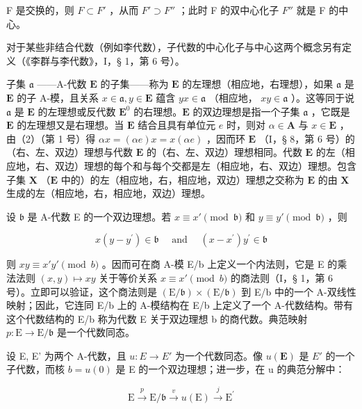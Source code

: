 F 是交换的，则 \(F \subset F'\) ，从而 \(F' \supset F''\) ；此时 F 的双中心化子 \(F''\) 就是 F 的中心。

对于某些非结合代数（例如李代数），子代数的中心化子与中心这两个概念另有定义（《李群与李代数》，I，§ 1，第 6 号）。

子集 \(\mathfrak{a}\) ——A-代数 \(\mathbf{E}\) 的子集——称为 \(\mathbf{E}\) 的左理想（相应地，右理想），如果 \(\mathfrak{a}\) 是 \(\mathbf{E}\) 的子 A-模，且关系 \(x \in \mathfrak{a}, y \in \mathbf{E}\) 蕴含 \(yx \in \mathfrak{a}\) （相应地， \(xy \in \mathfrak{a}\) ）。这等同于说 \(\mathfrak{a}\) 是 \(\mathbf{E}\) 的左理想或反代数 \(\mathbf{E}^0\) 的右理想。\(\mathbf{E}\) 的双边理想是指一个子集 \(\mathfrak{a}\) ，它既是 \(\mathbf{E}\) 的左理想又是右理想。当 \(\mathbf{E}\) 结合且具有单位元 \(e\) 时，则对 \(\alpha \in \mathbf{A}\) 与 \(x \in \mathbf{E}\) ，由（2）（第 1 号）得 \(\alpha x = (\alpha e)x = x(\alpha e)\) ，因而环 \(\mathbf{E}\) （I，§ 8，第 6 号）的（右、左、双边）理想与代数 \(\mathbf{E}\) 的（右、左、双边）理想相同。代数 \(\mathbf{E}\) 的左（相应地，右、双边）理想的每个和与每个交都是左（相应地，右、双边）理想。包含子集 \(\mathbf{X}\) （\(\mathbf{E}\) 中的）的左（相应地，右，相应地，双边）理想之交称为 \(\mathbf{E}\) 的由 \(\mathbf{X}\) 生成的左（相应地，右，相应地，双边）理想。

设 \(\mathfrak{b}\) 是 A-代数 E 的一个双边理想。若 \(x \equiv x'\pmod{\mathfrak{b}}\) 和 \(y \equiv y'\pmod{\mathfrak{b}}\) ，则

\[
x (y - y ^ {\prime}) \in \mathfrak {b} \quad \text { and } \quad (x - x ^ {\prime}) y ^ {\prime} \in \mathfrak {b}
\]

则 \(xy \equiv x'y' \pmod{b}\) 。因而可在商 A-模 E/b 上定义一个内法则，它是 E 的乘法法则 \((x,y) \mapsto xy\) 关于等价关系 \(x \equiv x' \pmod{b}\) 的商法则（I，§ 1，第 6 号）。立即可以验证，这个商法则是 \((\mathrm{E} / \mathfrak{b}) \times (\mathrm{E} / \mathfrak{b})\) 到 E/b 中的一个 A-双线性映射；因此，它连同 E/b 上的 A-模结构在 E/b 上定义了一个 A-代数结构。带有这个代数结构的 E/b 称为代数 E 关于双边理想 b 的商代数。典范映射 \(p: \mathrm{E} \to \mathrm{E} / \mathfrak{b}\) 是一个代数同态。

设 E, E' 为两个 A-代数，且 \(u:E \rightarrow E'\) 为一个代数同态。像 \(u(\mathbf{E})\) 是 \(E'\) 的一个子代数，而核 \(b = u(0)\) 是 E 的一个双边理想；进一步，在 u 的典范分解中：

\[
\mathrm{E} \xrightarrow {p} \mathrm{E} / \mathfrak {b} \xrightarrow {v} u (\mathrm{E}) \xrightarrow {j} \mathrm{E} ^ {\prime}
\]

